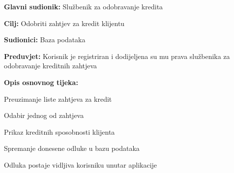                 \noindent {}
                \begin{packed_item}
                
                  \item \textbf{Glavni sudionik: } Službenik za odobravanje kredita
                  \item  \textbf{Cilj:} Odobriti zahtjev za kredit klijentu
                  \item  \textbf{Sudionici:} Baza podataka
                  \item  \textbf{Preduvjet:} Korisnik je registriran i dodijeljena su mu prava službenika za odobravanje kreditnih zahtjeva 
                  \item  \textbf{Opis osnovnog tijeka:}
                  
                  \item[] \begin{packed_enum}
                
                    \item Preuzimanje liste zahtjeva za kredit
                    \item Odabir jednog od zahtjeva 
                    \item Prikaz kreditnih sposobnosti klijenta
                    \item Spremanje donesene odluke u bazu podataka
                    \item Odluka postaje vidljiva korisniku unutar aplikacije
                    
                      \end{packed_enum}
                    \end{packed_item}
            
